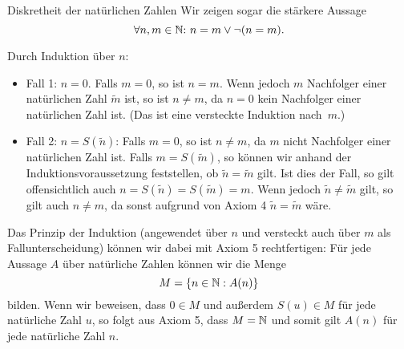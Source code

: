\documentclass{pizzablatt}
\begin{document}

\begin{aufgabe}{Diskretheit der natürlichen Zahlen}
Wir zeigen sogar die stärkere Aussage
\[ \forall n,m \in \mathbb{N}{:}\ n = m \vee \neg(n = m). \]

Durch Induktion über $n$:
\begin{itemize}
\item Fall 1: $n = 0$. Falls $m = 0$, so ist $n = m$. Wenn jedoch $m$ Nachfolger einer natürlichen Zahl $\widetilde{m}$ ist, so ist $n \not= m$, da $n = 0$ kein Nachfolger einer natürlichen Zahl ist. (Das ist eine versteckte Induktion nach~$m$.)
\item Fall 2: $n = S(\widetilde{n})$: Falls $m = 0$, so ist $n \not= m$, da $m$ nicht Nachfolger einer natürlichen Zahl ist. Falls $m = S(\widetilde{m})$, so können wir anhand der Induktionsvoraussetzung feststellen, ob $\widetilde{n} = \widetilde{m}$ gilt. Ist dies der Fall, so gilt offensichtlich auch $n = S(\widetilde{n}) = S(\widetilde{m}) = m$. Wenn jedoch $\widetilde{n} \not= \widetilde{m}$ gilt, so gilt auch $n \not= m$, da sonst aufgrund von Axiom 4 $\widetilde{n} = \widetilde{m}$ wäre.
\end{itemize}

Das Prinzip der Induktion (angewendet über $n$ und versteckt auch über $m$ als Fallunterscheidung) können wir dabei mit Axiom 5 rechtfertigen: Für jede Aussage $A$ über natürliche Zahlen können wir die Menge
\[ M = \{ n \in \mathbb{N} : A(n) \} \]
bilden. Wenn wir beweisen, dass $0 \in M$ und außerdem $S(u) \in M$ für jede natürliche Zahl $u$, so folgt aus Axiom 5, dass $M = \mathbb{N}$ und somit gilt $A(n)$ für jede natürliche Zahl $n$.
\end{aufgabe}
\end{document}
